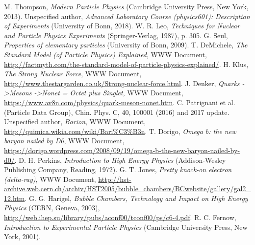 \documentclass[twocolumn]{article}
\begin{document}
\begin{thebibliography}{9}
M. Thompson, \textsl{Modern Particle Physics} (Cambridge University Press, New York, 2013).
Unspecified author, \textsl{Advanced Laboratory Course (physics601): Description of Experiments} (University of Bonn, 2018).
W. R. Leo, \textsl{Techniques for Nuclear and Particle Physics Experiments} (Springer-Verlag, 1987), p. 305.
G. Seul, \textsl{Properties of elementary particles} (University of Bonn, 2009).
T. DeMichele, \textit{The Standard Model (of Particle Physics) Explained}, WWW Document, \url{http://factmyth.com/the-standard-model-of-particle-physics-explained/}.
H. Klus, \textit{The Strong Nuclear Force}, WWW Document, \url{http://www.thestargarden.co.uk/Strong-nuclear-force.html}.
J. Denker, \textit{Quarks -\textgreater Mesons -\textgreater Nonet = Octet plus Singlet}, WWW Document, \url{https://www.av8n.com/physics/quark-meson-nonet.htm}.
C. Patrignani et al. (Particle Data Group), Chin. Phys. C, 40, 100001 (2016) and 2017 update.
Unspecified author, \textit{Barion}, WWW Document, \url{http://quimica.wikia.com/wiki/Bari\%C3\%B3n}.
T. Dorigo, \textit{Omega b: the new baryon nailed by D0}, WWW Document, \url{https://dorigo.wordpress.com/2008/09/19/omega-b-the-new-baryon-nailed-by-d0/}.
D. H. Perkins, \textsl{Introduction to High Energy Physics} (Addison-Wesley Publishing Company, Reading, 1972).
G. T. Jones, \textsl{Pretty knock-on electron (delta-ray)}, WWW Document, \url{http://hst-archive.web.cern.ch/archiv/HST2005/bubble_chambers/BCwebsite/gallery/gal2_12.htm}.
G. G. Harigel, \textsl{Bubble Chambers, Technology and Impact on High Energy Physics} (CERN, Geneva, 2003), \url{http://web.ihep.su/library/pubs/aconf00/tconf00/ps/c6-4.pdf}.
R. C. Fernow, \textsl{Introduction to Experimental Particle Physics} (Cambridge University Press, New York, 2001).

\iffalse
\bibitem{book}
K. Siegbahn, \textsl{Alpha-, beta-, and gamma-ray spectroscopy, Vol. 2} (North Holland Publishing Company, Amsterdam, 1965).
 \bibitem{link}
 W. U. Boeglin, \textit{Scintillation Detectors}, WWW Document, \url{http://wanda.fiu.edu/teaching/courses/Modern_lab_manual/scintillator.html}.
\bibitem{pdf_on_website}
Unspecified author, \textsl{Gamma Ray Spectroscopy} (University of Florida, 2013), \url{https://www.phys.ufl.edu/courses/phy4803L/group_I/gamma_spec/gamspec.pdf}.
\bibitem{cfd}
E. Ermis and C. Celiktas, International Journal Of Instrumentation Science 1, (2013), pp.54-62.
\bibitem{signal}
M. Nakhostin, \textsl{Signal Processing for Radiation Detectors} (John Wiley $\&$ Sons, 2018), p. 298\footnote{Relevant pages (chapter 6) available for preview under\\ \url{https://books.google.de/books?id=Lrg4DwAAQBAJ}}.
\bibitem{meliss}
A. C. Melissinos, J. Napolitano, \textsl{Experiments in Modern Physics, 2\textsuperscript{nd} edition} (Academic Press, San Diego, 2003), pp 419-21.
\fi
\end{thebibliography}
\end{document}
